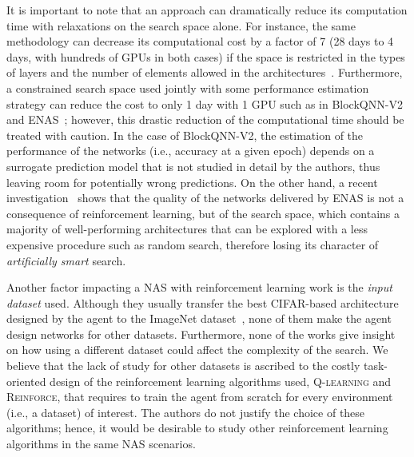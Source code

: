 It is important to note that an approach can dramatically reduce its computation time with relaxations on the search space alone. For instance, the same methodology can decrease its computational cost by a factor of 7 (28 days to 4 days, with hundreds of GPUs in both cases) if the space is restricted in the types of layers and the number of elements allowed in the architectures~\citep{ZophNAS1, ZophNAS2}. Furthermore, a constrained search space used jointly with some performance estimation strategy can reduce the cost to only 1 day with 1 GPU such as in BlockQNN-V2~\citep{BlockQNN} and ENAS~\citep{ENAS}; however, this drastic reduction of the computational time should be treated with caution. In the case of BlockQNN-V2, the estimation of the performance of the networks (i.e., accuracy at a given epoch) depends on a surrogate prediction model that is not studied in detail by the authors, thus leaving room for potentially wrong predictions. On the other hand, a recent investigation~\citep{ENASbad} shows that the quality of the networks delivered by ENAS is not a consequence of reinforcement learning, but of the search space, which contains a majority of well-performing architectures that can be explored with a less expensive procedure such as random search, therefore losing its character of \textit{artificially smart} search.

Another factor impacting a NAS with reinforcement learning work is the \textit{input dataset} used. Although they usually transfer the best CIFAR-based architecture designed by the agent to the ImageNet dataset~\citep{BakerNAS, ZophNAS1, ZophNAS2, PathNAS, ENAS}, none of them make the agent design networks for other datasets. Furthermore, none of the works give insight on how using a different dataset could affect the complexity of the search. We believe that the lack of study for other datasets is ascribed to the costly task-oriented design of the reinforcement learning algorithms used, \textsc{Q-learning} and \textsc{Reinforce}, that requires to train the agent from scratch for every environment (i.e., a dataset) of interest. The authors do not justify the choice of these algorithms; hence, it would be desirable to study other reinforcement learning algorithms in the same NAS scenarios.